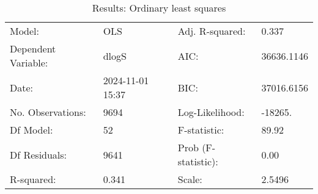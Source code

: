 \begin{table}
\caption{Results: Ordinary least squares}
\label{}
\begin{center}
\begin{tabular}{llll}
\hline
Model:              & OLS              & Adj. R-squared:     & 0.337       \\
Dependent Variable: & dlogS            & AIC:                & 36636.1146  \\
Date:               & 2024-11-01 15:37 & BIC:                & 37016.6156  \\
No. Observations:   & 9694             & Log-Likelihood:     & -18265.     \\
Df Model:           & 52               & F-statistic:        & 89.92       \\
Df Residuals:       & 9641             & Prob (F-statistic): & 0.00        \\
R-squared:          & 0.341            & Scale:              & 2.5496      \\
\hline
\end{tabular}
\end{center}


\end{table}
